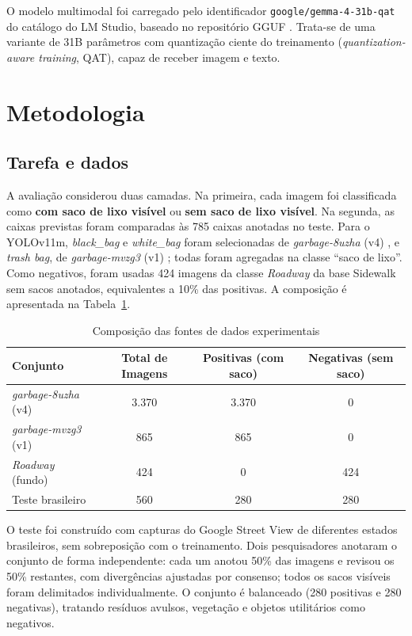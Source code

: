 \documentclass[kdmile,a4paper]{kdmile}
\begin{document}
O modelo multimodal foi carregado pelo identificador \texttt{google/gemma-4-31b-qat} do catálogo do LM Studio, baseado no repositório GGUF  \cite{LMStudioGemma431BQAT}. Trata-se de uma variante de 31B parâmetros com quantização ciente do treinamento (\emph{quantization-aware training}, QAT), capaz de receber imagem e texto.

\section{Metodologia}
\label{sec:metodologia}

\subsection{Tarefa e dados}
\label{sec:tarefa-dados}

A avaliação considerou duas camadas. Na primeira, cada imagem foi classificada como \textbf{com saco de lixo visível} ou \textbf{sem saco de lixo visível}. Na segunda, as caixas previstas foram comparadas às 785 caixas anotadas no teste. Para o YOLOv11m, \emph{black\_bag} e \emph{white\_bag} foram selecionadas de \emph{garbage-8uzha} (v4) \cite{roboflow2026a}, e \emph{trash bag}, de \emph{garbage-mvzg3} (v1) \cite{roboflow2026b}; todas foram agregadas na classe ``saco de lixo''. Como negativos, foram usadas 424 imagens da classe \emph{Roadway} da base Sidewalk \cite{sidewalk2022dataset} sem sacos anotados, equivalentes a 10\% das positivas. A composição é apresentada na Tabela~\ref{tab:conjuntos}.

\begin{table}[t]
\centering
\footnotesize
\caption{Composição das fontes de dados experimentais}
\label{tab:conjuntos}
\begin{tabular}{lccc}
\toprule
\textbf{Conjunto} & \textbf{Total de Imagens} & \textbf{Positivas (com saco)} & \textbf{Negativas (sem saco)} \\
\midrule
\emph{garbage-8uzha} (v4) & 3.370 & 3.370 & 0 \\
\emph{garbage-mvzg3} (v1) & 865 & 865 & 0 \\
\emph{Roadway} (fundo) & 424 & 0 & 424 \\
Teste brasileiro & 560 & 280 & 280 \\
\bottomrule
\end{tabular}
\end{table}

O teste foi construído com capturas do Google Street View \cite{google2026policy} de diferentes estados brasileiros, sem sobreposição com o treinamento. Dois pesquisadores anotaram o conjunto de forma independente: cada um anotou 50\% das imagens e revisou os 50\% restantes, com divergências ajustadas por consenso; todos os sacos visíveis foram delimitados individualmente. O conjunto é balanceado (280 positivas e 280 negativas), tratando resíduos avulsos, vegetação e objetos utilitários como negativos.
\end{document}
